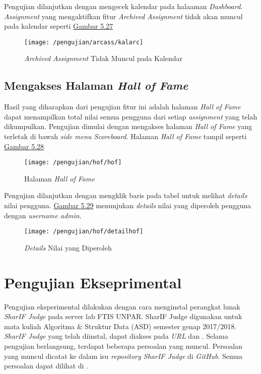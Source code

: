 	Pengujian dilanjutkan dengan mengecek kalendar pada halaaman \textit{Dashboard}. \textit{Assignment} yang mengaktifkan fitur \textit{Archived Assignment} tidak akan muncul pada kalendar seperti \hyperref[fig:kalarc]{Gambar 5.27}
	\begin{figure}[H]
		\centering  
		\texttt{[image: /pengujian/arcass/kalarc]}  
		\caption[\textit{Archived Assignment} Tidak Muncul pada Kalendar]{\textit{Archived Assignment} Tidak Muncul pada Kalendar} 
		\label{fig:kalarc} 
	\end{figure}

	\subsection{Mengakses Halaman \textit{Hall of Fame}}
	Hasil yang diharapkan dari pengujian fitur ini adalah halaman \textit{Hall of Fame} dapat menampilkan total nilai semua pengguna dari setiap \textit{assignment} yang telah dikumpulkan. Pengujian dimulai dengan mengakses halaman \textit{Hall of Fame} yang terletak di bawah \textit{side menu Scoreboard}. Halaman \textit{Hall of Fame} tampil seperti \hyperref[fig:halhof]{Gambar 5.28}
	\begin{figure}[H]
		\centering  
		\texttt{[image: /pengujian/hof/hof]}  
		\caption[Halaman \textit{Hall of Fame}]{Halaman \textit{Hall of Fame}} 
		\label{fig:halhof} 
	\end{figure}

	Pengujian dilanjutkan dengan mengklik baris pada tabel untuk melihat \textit{details} nilai pengguna. \hyperref[fig:dethof]{Gambar 5.29} menunjukan \textit{details} nilai yang diperoleh pengguna dengan \textit{username admin}.
	\begin{figure}[H]
		\centering  
		\texttt{[image: /pengujian/hof/detailhof]}  
		\caption[\textit{Details} Nilai yang Diperoleh]{\textit{Details} Nilai yang Diperoleh} 
		\label{fig:dethof} 
	\end{figure}
	
\section{Pengujian Ekseprimental}
Pengujian eksperimental dilakukan dengan cara menginstal perangkat lunak \textit{SharIF Judge} pada server lab FTIS UNPAR. SharIF Judge digunakan untuk mata kuliah Algoritma \& Struktur Data (ASD) semester genap 2017/2018. \textit{SharIF Judge} yang telah diinstal, dapat diakses pada \textit{URL}  dan . Selama pengujian berlangsung, terdapat beberapa persoalan yang muncul. Persoalan yang muncul dicatat ke dalam isu \textit{repository SharIF Judge} di \textit{GitHub}. Semua persoalan dapat dilihat di .


